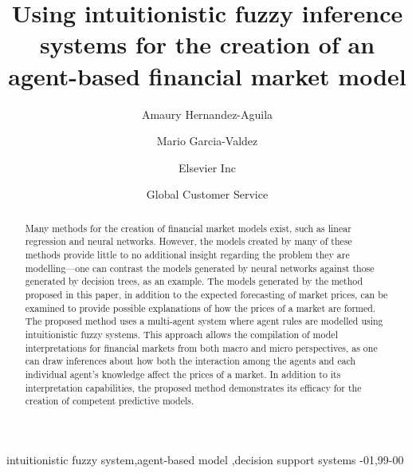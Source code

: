 \documentclass[review]{elsarticle}
\begin{document}
\begin{frontmatter}

\title{Using intuitionistic fuzzy inference systems for the creation of an agent-based financial market model}

\author{Amaury Hernandez-Aguila}
\address{Radarweg 29, Amsterdam}

\author{Mario Garcia-Valdez}
\address{Radarweg 29, Amsterdam}

\author[mymainaddress,mysecondaryaddress]{Elsevier Inc}

\author[mysecondaryaddress]{Global Customer Service}

\address[mymainaddress]{1600 John F Kennedy Boulevard, Philadelphia}
\address[mysecondaryaddress]{360 Park Avenue South, New York}

\begin{abstract}

Many methods for the creation of financial market models exist, such as linear
regression and neural networks. However, the models created by many of these
methods provide little to no additional insight regarding the problem they are
modelling---one can contrast the models generated by neural networks against
those generated by decision trees, as an example. The models generated by the
method proposed in this paper, in addition to the expected forecasting of
market prices, can be examined to provide possible explanations of how the
prices of a market are formed. The proposed method uses a multi-agent system
where agent rules are modelled using intuitionistic fuzzy systems. This
approach allows the compilation of model interpretations for financial markets
from both macro and micro perspectives, as one can draw inferences about how
both the interaction among the agents and each individual agent's knowledge
affect the prices of a market. In addition to its interpretation capabilities,
the proposed method demonstrates its efficacy for the creation of competent
predictive models.
\end{abstract}

\begin{keyword}
intuitionistic fuzzy system\sep agent-based model \sep decision support systems
-01\sep  99-00
\end{keyword}

\end{frontmatter}
\end{document}
